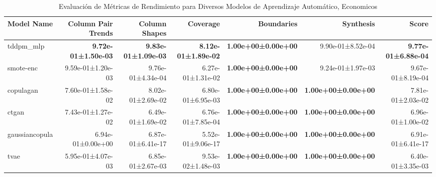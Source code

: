 \begin{table}[H]
\centering
\fontsize{7}{14}\selectfont
\caption{Evaluación de Métricas de Rendimiento para Diversos Modelos de Aprendizaje Automático, Economicos}
\label{table-score-economicos-b}
\begin{tabular}{|l|r|r|r|r|r|r|}
\hline
 \rowcolor[gray]{0.8}
Model Name & Column Pair Trends & Column Shapes & Coverage & Boundaries & Synthesis & \textbf{Score} \\
\hline tddpm\_mlp & \bfseries 9.72e-01±1.50e-03 & \bfseries 9.83e-01±1.09e-03 & \bfseries 8.12e-01±1.89e-02 & \bfseries 1.00e+00±0.00e+00 & 9.90e-01±8.52e-04 & \bfseries 9.77e-01±6.88e-04 \\
\hline smote-enc & 9.59e-01±1.20e-03 & 9.76e-01±4.34e-04 & 6.27e-01±1.31e-02 & \bfseries 1.00e+00±0.00e+00 & 9.24e-01±1.97e-03 & 9.67e-01±8.19e-04 \\
\hline copulagan & 7.60e-01±1.58e-02 & 8.02e-01±2.69e-02 & 6.80e-01±6.95e-03 & \bfseries 1.00e+00±0.00e+00 & \bfseries 1.00e+00±0.00e+00 & 7.81e-01±2.03e-02 \\
\hline ctgan & 7.43e-01±1.27e-02 & 6.49e-01±1.69e-02 & 6.76e-01±7.85e-04 & \bfseries 1.00e+00±0.00e+00 & \bfseries 1.00e+00±0.00e+00 & 6.96e-01±1.00e-02 \\
\hline gaussiancopula & 6.94e-01±0.00e+00 & 6.87e-01±6.41e-17 & 5.52e-01±9.06e-17 & \bfseries 1.00e+00±0.00e+00 & \bfseries 1.00e+00±0.00e+00 & 6.91e-01±6.41e-17 \\
\hline tvae & 5.95e-01±4.07e-03 & 6.85e-01±2.67e-03 & 9.53e-02±1.48e-03 & \bfseries 1.00e+00±0.00e+00 & \bfseries 1.00e+00±0.00e+00 & 6.40e-01±3.35e-03 \\
\hline
\end{tabular}
\end{table}
